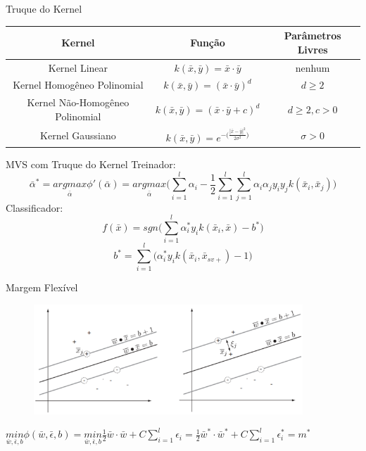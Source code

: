 \documentclass{beamer}
\begin{document}
\begin{frame}{Truque do Kernel}
\begin{table}
    \small
    \centering
    \begin{tabular}{|c|c|c|} \hline
            Kernel & Função & Parâmetros Livres \\ \hline
        Kernel Linear & $k(\bar{x},\bar{y})=\bar{x}\cdot\bar{y}$ & nenhum \\
        Kernel Homogêneo Polinomial & $k(\bar{x},\bar{y})=(\bar{x}\cdot\bar{y})^d$ & $d\ge2$ \\
        Kernel Não-Homogêneo Polinomial & $k(\bar{x},\bar{y})=(\bar{x}\cdot\bar{y}+c)^d$ & $d\ge2, c > 0$ \\
        Kernel Gaussiano & $k(\bar{x},\bar{y})=e^{-\big(\frac{|\bar{x}-\bar{y}|^2}{2\sigma^2}\big)}$ & $\sigma>0$ \\ \hline
    \end{tabular}
\end{table}
\end{frame}

\begin{frame}{MVS com Truque do Kernel}
Treinador:
\begin{equation}
    \bar{\alpha}^* = \underset{\bar{\alpha}}{argmax}{\phi}'(\bar{\alpha}) =\underset{\bar{\alpha}}{argmax} \Bigg( \sum_{i=1}^{l}\alpha_i - \frac{1}{2}\sum_{i=1}^{l}\sum_{j=1}^{l}\alpha_i \alpha_j y_i y_j k(\bar{x}_i,\bar{x}_j) \Bigg)
    \label{eq:EQ_Treinador_2}
\end{equation}
Classificador:
\begin{equation}
    f(\bar{x}) = sgn\Bigg(
        \sum_{i=1}^{l} \alpha_i^*y_i k(\bar{x}_i,\bar{x})
        -b^*
    \Bigg)
    \label{eq:EQ_Classificador_2}
\end{equation}
\begin{equation}
    b^* = \sum_{i=1}^{l}
    \Bigg(
        \alpha_i^*y_i k(\bar{x}_i,\bar{x}_{sv+})-1
    \Bigg)
    \label{eq:EQ_B_2}
\end{equation}
\end{frame}

\begin{frame}{Margem Flexível}
\begin{figure}
    \centering
    \includegraphics[width=0.9\textwidth]{svm_6.png}
\end{figure}
$\underset{\bar{w}, \bar{\epsilon}, b}{min}\phi(\bar{w}, \bar{\epsilon},b)
    = \underset{\bar{w}, \bar{\epsilon}, b}{min}\frac{1}{2}\bar{w}\cdot\bar{w} + C\sum_{i=1}^l \epsilon_i
    = \frac{1}{2}\bar{w}^*\cdot\bar{w}^* + C\sum_{i=1}^l \epsilon_i^*
    =m^*$
\end{frame}
\end{document}
